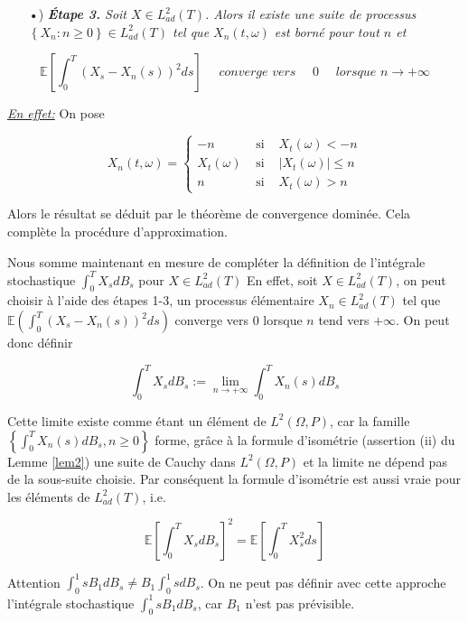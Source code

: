 \documentclass[A4paper,12pt]{report}
\newcommand{\E}{{\mathbb{E}}}
\begin{document}
\begin{itemize}
 \item[•)] \textit{\textbf{Étape 3.} Soit $X \in L_{a d}^{2}(T)$. Alors il existe une suite de processus $\left\{X_{n}: n \geq 0\right\} \in L_{a d}^{2}(T)$ tel que $X_{n}(t, \omega)$ est borné pour tout $n$ et}
\end{itemize}

$$
\E\left[ \int_{0}^{T}\left(X_s-X_{n}(s)\right)^{2} d s\right] \quad \textit { converge vers } \quad 0 \quad \textit { lorsque } n \rightarrow+\infty
$$

\underline{\textit{En effet:}} On pose

$$
X_{n}(t, \omega)=\left\{\begin{array}{ccc}
-n & \text { si } & X_t (\omega)<-n \\
X_t(\omega) & \text { si } & |X_t(\omega)| \leq n \\
n & \text { si } & X_t(\omega)>n
\end{array}\right.
$$

Alors le résultat se déduit par le théorème de convergence dominée. Cela complète la procédure d'approximation.

Nous somme maintenant en mesure de compléter la définition de l'intégrale stochastique $\int_{0}^{T} X_s d B_{s}$ pour $X \in L_{a d}^{2}(T)$ En effet, soit $X \in L_{a d}^{2}(T)$, on peut choisir à l'aide des étapes 1-3, un processus élémentaire $X_{n} \in L_{a d}^{2}(T)$ tel que $\E\left( \int_{0}^{T}\left(X_s-X_{n}(s)\right)^{2} d s \right)$ converge vers 0 lorsque $n$ tend vers $+\infty$. On peut donc définir

$$
\int_{0}^{T} X_s d B_{s}:=\lim _{n \rightarrow+\infty} \int_{0}^{T} X_{n}(s) d B_{s}
$$

Cette limite existe comme étant un élément de $L^{2}(\Omega, P)$, car la famille $\left\{\int_{0}^{T} X_{n}(s) d B_{s}, n \geq 0\right\}$ forme, grâce à la formule d'isométrie (assertion (ii) du Lemme \ref{lem2}) une suite de Cauchy dans $L^{2}(\Omega, P)$ et la limite ne dépend pas de la sous-suite choisie. Par conséquent la formule d'isométrie est aussi vraie pour les éléments de $L_{a d}^{2}(T)$, i.e.

$$
\E\left[\int_{0}^{T} X_s d B_{s}\right]^{2}=\E \left[\int_{0}^{T}X_s ^{2} d s\right]
$$

Attention $\int_{0}^{1} s B_{1} d B_{s} \neq B_{1} \int_{0}^{1} s d B_{s}$. On ne peut pas définir avec cette approche l'intégrale stochastique $\int_{0}^{1} s B_{1} d B_{s}$, car $B_{1}$ n'est pas prévisible.
\end{document}
